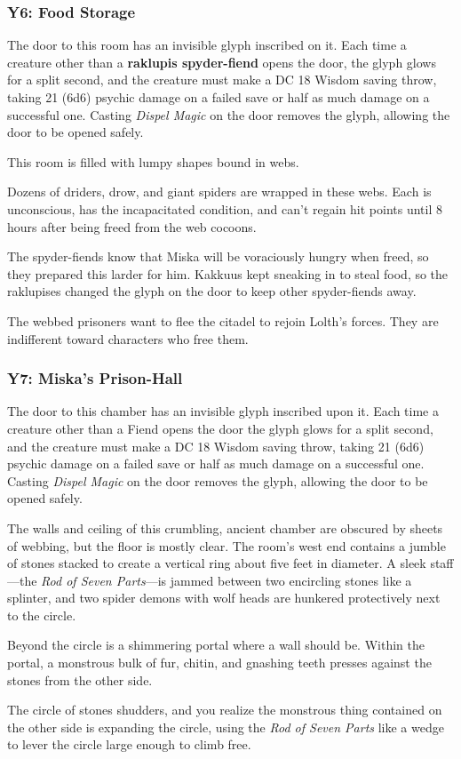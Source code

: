 \documentclass[10pt,a4paper,twoside,bg=print,twocolumn,openany,nodeprecatedcode]{dndbook}
\begin{document}
\subsubsection{Y6: Food Storage}
The door to this room has an invisible glyph inscribed on it. Each time a creature other than a \textbf{raklupis spyder-fiend} opens the door, the glyph glows for a split second, and the creature must make a DC 18 Wisdom saving throw, taking 21 (6d6) psychic damage on a failed save or half as much damage on a successful one. Casting \textit{Dispel Magic} on the door removes the glyph, allowing the door to be opened safely.

\begin{DndReadAloud}{}
This room is filled with lumpy shapes bound in webs.

\end{DndReadAloud}

Dozens of driders, drow, and giant spiders are wrapped in these webs. Each is unconscious, has the incapacitated condition, and can't regain hit points until 8 hours after being freed from the web cocoons.

The spyder-fiends know that Miska will be voraciously hungry when freed, so they prepared this larder for him. Kakkuus kept sneaking in to steal food, so the raklupises changed the glyph on the door to keep other spyder-fiends away.

The webbed prisoners want to flee the citadel to rejoin Lolth's forces. They are indifferent toward characters who free them.

\subsubsection{Y7: Miska's Prison-Hall}
The door to this chamber has an invisible glyph inscribed upon it. Each time a creature other than a Fiend opens the door the glyph glows for a split second, and the creature must make a DC 18 Wisdom saving throw, taking 21 (6d6) psychic damage on a failed save or half as much damage on a successful one. Casting \textit{Dispel Magic} on the door removes the glyph, allowing the door to be opened safely.

\begin{DndReadAloud}{}
The walls and ceiling of this crumbling, ancient chamber are obscured by sheets of webbing, but the floor is mostly clear. The room's west end contains a jumble of stones stacked to create a vertical ring about five feet in diameter. A sleek staff—the \textit{Rod of Seven Parts}—is jammed between two encircling stones like a splinter, and two spider demons with wolf heads are hunkered protectively next to the circle.

Beyond the circle is a shimmering portal where a wall should be. Within the portal, a monstrous bulk of fur, chitin, and gnashing teeth presses against the stones from the other side.

The circle of stones shudders, and you realize the monstrous thing contained on the other side is expanding the circle, using the \textit{Rod of Seven Parts} like a wedge to lever the circle large enough to climb free.

\end{DndReadAloud}
\end{document}
